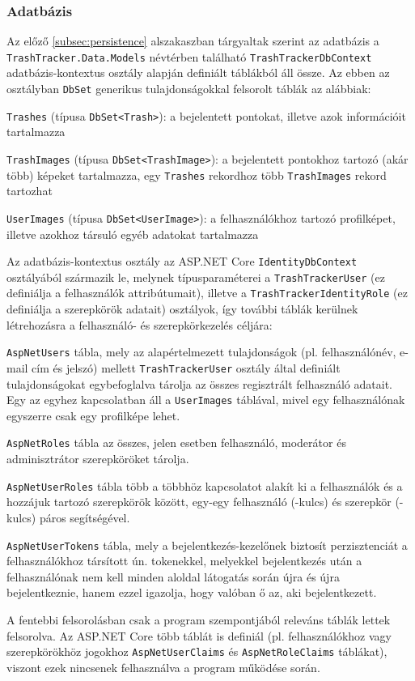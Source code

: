 \subsubsection{Adatbázis}

Az előző \ref{subsec:persistence} alszakaszban tárgyaltak szerint az adatbázis a \texttt{TrashTracker.Data.Models} névtérben található \texttt{TrashTrackerDbContext} adatbázis-kontextus osztály alapján definiált táblákból áll össze. Az ebben az osztályban \texttt{DbSet} generikus tulajdonságokkal felsorolt táblák az alábbiak:
\begin{compactitem}
	\item \texttt{Trashes} (típusa \texttt{DbSet<Trash>}): a bejelentett pontokat, illetve azok információit tartalmazza
	\item \texttt{TrashImages} (típusa \texttt{DbSet<TrashImage>}): a bejelentett pontokhoz tartozó (akár több) képeket tartalmazza, egy \texttt{Trashes} rekordhoz több \texttt{TrashImages} rekord tartozhat
	\item \texttt{UserImages} (típusa \texttt{DbSet<UserImage>}): a felhasználókhoz tartozó profilképet, illetve azokhoz társuló egyéb adatokat tartalmazza
\end{compactitem}
Az adatbázis-kontextus osztály az ASP.NET Core \texttt{IdentityDbContext} osztályából származik le, melynek típusparaméterei a \texttt{TrashTrackerUser} (ez definiálja a felhasználók attribútumait), illetve a \texttt{TrashTrackerIdentityRole} (ez definiálja a szerepkörök adatait) osztályok, így további táblák kerülnek létrehozásra a felhasználó- és szerepkörkezelés céljára:
\begin{compactitem}
	\item \texttt{AspNetUsers} tábla, mely az alapértelmezett tulajdonságok (pl. felhasználónév, e-mail cím és jelszó) mellett \texttt{TrashTrackerUser} osztály által definiált tulajdonságokat egybefoglalva tárolja az összes regisztrált felhasználó adatait. Egy az egyhez kapcsolatban áll a \texttt{UserImages} táblával, mivel egy felhasználónak egyszerre csak egy profilképe lehet.
	\item \texttt{AspNetRoles} tábla az összes, jelen esetben felhasználó, moderátor és adminisztrátor szerepköröket tárolja.
	\item \texttt{AspNetUserRoles} tábla több a többhöz kapcsolatot alakít ki a felhasználók és a hozzájuk tartozó szerepkörök között, egy-egy felhasználó (-kulcs) és szerepkör (-kulcs) páros segítségével.
	\item \texttt{AspNetUserTokens} tábla, mely a bejelentkezés-kezelőnek biztosít perzisztenciát a felhasználókhoz társított ún. tokenekkel, melyekkel bejelentkezés után a felhasználónak nem kell minden aloldal látogatás során újra és újra bejelentkeznie, hanem ezzel igazolja, hogy valóban ő az, aki bejelentkezett.
\end{compactitem}
\begin{note}
	A fentebbi felsorolásban csak a program szempontjából releváns táblák lettek felsorolva. Az ASP.NET Core több táblát is definiál (pl. felhasználókhoz vagy szerepkörökhöz jogokhoz \texttt{AspNetUserClaims} és \texttt{AspNetRoleClaims} táblákat), viszont ezek nincsenek felhasználva a program működése során.
\end{note}

